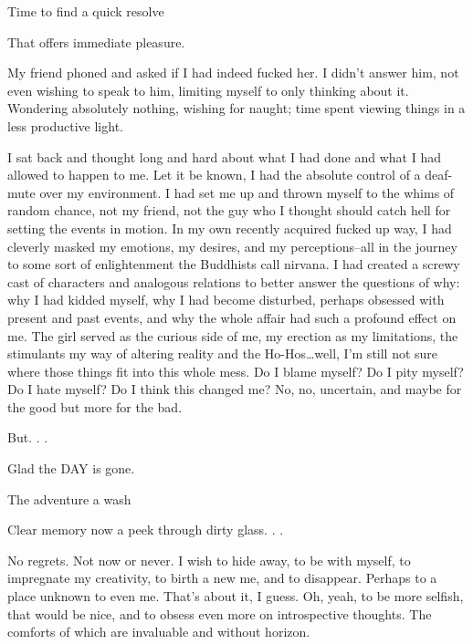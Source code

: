 \documentclass[
]{article}
\begin{document}
Time to find a quick resolve

That offers immediate pleasure.

My friend phoned and asked if I had indeed fucked her. I didn't answer
him, not even wishing to speak to him, limiting myself to only thinking
about it. Wondering absolutely nothing, wishing for naught; time spent
viewing things in a less productive light.

I sat back and thought long and hard about what I had done and what I
had allowed to happen to me. Let it be known, I had the absolute control
of a deaf-mute over my environment. I had set me up and thrown myself to
the whims of random chance, not my friend, not the guy who I thought
should catch hell for setting the events in motion. In my own recently
acquired fucked up way, I had cleverly masked my emotions, my desires,
and my perceptions--all in the journey to some sort of enlightenment the
Buddhists call nirvana. I had created a screwy cast of characters and
analogous relations to better answer the questions of why: why I had
kidded myself, why I had become disturbed, perhaps obsessed with present
and past events, and why the whole affair had such a profound effect on
me. The girl served as the curious side of me, my erection as my
limitations, the stimulants my way of altering reality and the
Ho-Hos\ldots well, I'm still not sure where those things fit into this
whole mess. Do I blame myself? Do I pity myself? Do I hate myself? Do I
think this changed me? No, no, uncertain, and maybe for the good but
more for the bad.

But. . .

Glad the DAY is gone.

The adventure a wash

Clear memory now a peek through dirty glass. . .

No regrets. Not now or never. I wish to hide away, to be with myself, to
impregnate my creativity, to birth a new me, and to disappear. Perhaps
to a place unknown to even me. That's about it, I guess. Oh, yeah, to be
more selfish, that would be nice, and to obsess even more on
introspective thoughts. The comforts of which are invaluable and without
horizon.
\end{document}
